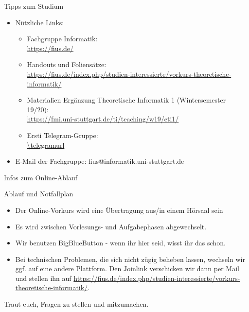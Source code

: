 \begin{frame}[fragile]{Tipps zum Studium}
  \begin{itemize}
    \item Nützliche Links:\\
          \begin{itemize}
            \item Fachgruppe Informatik:\\
                  \url{https://fius.de/}
            \item Handouts und Foliensätze:\\ \url{https://fius.de/index.php/studien-interessierte/vorkurs-theoretische-informatik/}
            \item Materialien Ergänzung Theoretische Informatik 1 (Wintersemester 19/20): \\
                  \url{https://fmi.uni-stuttgart.de/ti/teaching/w19/eti1/}
            \item Ersti Telegram-Gruppe:\\
                  \qrcode[hyperlink]{\telegramurl}
                  \url{\telegramurl}
          \end{itemize}
    \item E-Mail der Fachgruppe: fius@informatik.uni-stuttgart.de

  \end{itemize}
\end{frame}

\begin{frame}[fragile]{Infos zum Online-Ablauf}
  \begin{alertblock}{Ablauf und Notfallplan}
    \begin{itemize}
      \item Der Online-Vorkurs wird eine Übertragung aus/in einem Hörsaal sein
      \item Es wird zwischen Vorlesungs- und Aufgabephasen abgewechselt.
      \item Wir benutzen BigBlueButton - wenn ihr hier seid, wisst ihr das schon.
      \item Bei technischen Problemen, die sich nicht zügig beheben lassen, wechseln wir ggf. auf eine andere Plattform. Den Joinlink verschicken wir dann per Mail und stellen ihn auf \url{https://fius.de/index.php/studien-interessierte/vorkurs-theoretische-informatik/}.
    \end{itemize}
    \alert{Traut euch, Fragen zu stellen und mitzumachen.}
  \end{alertblock}
\end{frame}

